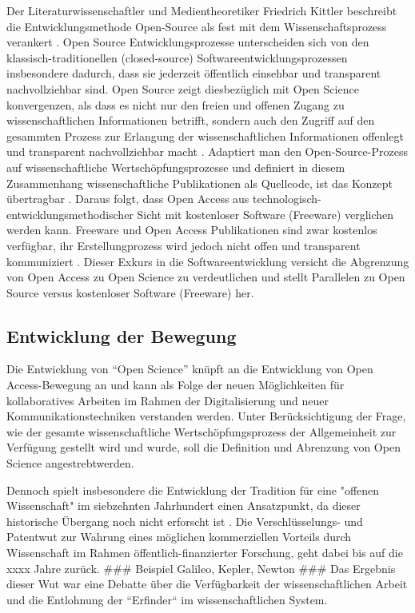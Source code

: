 Der Literaturwissenschaftler und Medientheoretiker Friedrich Kittler beschreibt die Entwicklungsmethode Open-Source als fest mit dem Wissenschaftsprozess verankert \cite{suchen}. Open Source Entwicklungsprozesse unterscheiden sich von den klassisch-traditionellen (closed-source) Softwareentwicklungsprozessen insbesondere dadurch, dass sie jederzeit öffentlich einsehbar und transparent nachvollziehbar sind. Open Source zeigt diesbezüglich mit Open Science konvergenzen, als dass es nicht nur den freien und offenen Zugang zu wissenschaftlichen Informationen betrifft, sondern auch den Zugriff auf den gesammten Prozess zur Erlangung der wissenschaftlichen Informationen offenlegt und transparent nachvollziehbar macht \cite{suchen}. Adaptiert man den Open-Source-Prozess auf wissenschaftliche Wertschöpfungsprozesse und definiert in diesem Zusammenhang wissenschaftliche Publikationen als Quellcode, ist das Konzept übertragbar \cite{Singh_2008} \cite{Bradley_2008} \cite{Bradley_2007}. Daraus folgt, dass Open Access aus technologisch-entwicklungsmethodischer Sicht mit kostenloser Software (Freeware) \cite{suchen} verglichen werden kann. Freeware und Open Access Publikationen sind zwar kostenlos verfügbar, ihr Erstellungprozess wird jedoch nicht offen und transparent kommuniziert \cite{suchen}. Dieser Exkurs in die Softwareentwicklung versicht die Abgrenzung von Open Access zu Open Science zu verdeutlichen und stellt Parallelen zu Open Source versus kostenloser Software (Freeware) her. 

\subsection{Entwicklung der Bewegung}

Die Entwicklung von “Open Science” knüpft an die Entwicklung von Open Access-Bewegung an und kann als Folge der neuen Möglichkeiten für kollaboratives Arbeiten im Rahmen der Digitalisierung und neuer Kommunikationstechniken verstanden werden. Unter Berücksichtigung der Frage, wie der gesamte wissenschaftliche Wertschöpfungsprozess der Allgemeinheit zur Verfügung gestellt wird und wurde, soll die Definition und Abrenzung von Open Science angestrebtwerden. 

Dennoch spielt insbesondere die Entwicklung der Tradition für eine "offenen Wissenschaft" im siebzehnten Jahrhundert einen Ansatzpunkt, da dieser historische Übergang noch nicht erforscht ist \cite{CREATe_2014}. Die Verschlüsselungs- und Patentwut zur Wahrung eines möglichen kommerziellen Vorteils durch Wissenschaft im Rahmen öffentlich-finanzierter Forschung, geht dabei bis auf die xxxx Jahre zurück. ### Beispiel Galileo, Kepler, Newton ### Das Ergebnis dieser Wut war eine Debatte über die Verfügbarkeit der wissenschaftlichen Arbeit und die Entlohnung der “Erfinder“ im wissenschaftlichen System. 

